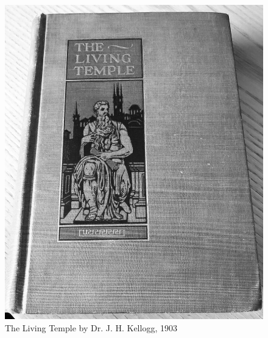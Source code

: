 \begin{figure}[hp]
    \centering
    \includegraphics[width=1\linewidth]{images/TLT.jpg}
    \caption*{The Living Temple by Dr. J. H. Kellogg, 1903}
    \label{fig:tlt}
\end{figure}


